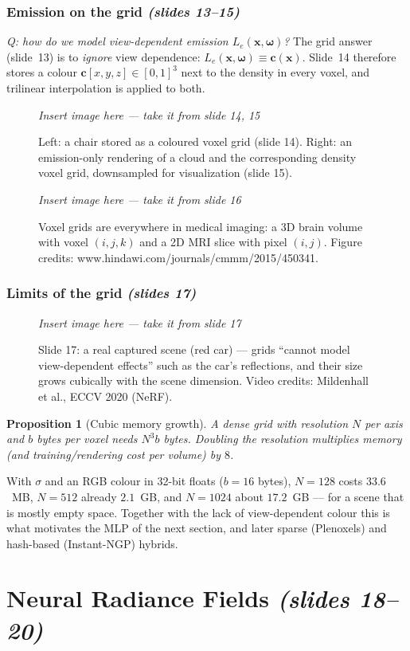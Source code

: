 \documentclass[11pt,a4paper]{article}
\newcommand{\xx}{\boldsymbol{x}}
\newcommand{\om}{\boldsymbol{\omega}}
\newcommand{\cc}{\boldsymbol{c}}
\newcommand{\Le}{L_e}
\newcommand{\sref}[1]{\texorpdfstring{\emph{(slides #1)}}{(slides #1)}}
\theoremstyle{definition}
\theoremstyle{plain}
\newtheorem{proposition}{Proposition}[section]
\newcommand{\slideimg}[3]{%
\begin{figure}[H]
\centering
\begin{tcolorbox}[enhanced,colback=white,colframe=white,boxrule=0pt,sharp corners,overlay={\draw[dashed,gray,thick] (frame.south west) rectangle (frame.north east);},
  width=0.92\linewidth,height=#2,valign=center,halign=center]
{\color{gray}\itshape Insert image here --- take it from slide #1}
\end{tcolorbox}
\caption{#3}
\end{figure}}
\begin{document}
\subsubsection*{Emission on the grid \sref{13--15}}

\emph{Q: how do we model view-dependent emission $\Le(\xx,\om)$?} The grid answer (slide~13) is to \emph{ignore} view dependence: $\Le(\xx,\om)\equiv\cc(\xx)$. Slide~14 therefore stores a colour $\cc[x,y,z]\in[0,1]^3$ next to the density in every voxel, and trilinear interpolation is applied to both.

\slideimg{14, 15}{4.4cm}{Left: a chair stored as a coloured voxel grid (slide 14). Right: an emission-only rendering of a cloud and the corresponding density voxel grid, downsampled for visualization (slide 15).}

\slideimg{16}{4.2cm}{Voxel grids are everywhere in medical imaging: a 3D brain volume with voxel $(i,j,k)$ and a 2D MRI slice with pixel $(i,j)$. Figure credits: www.hindawi.com/journals/cmmm/2015/450341.}

\subsubsection*{Limits of the grid \sref{17}}

\slideimg{17}{4.2cm}{Slide 17: a real captured scene (red car) --- grids ``cannot model view-dependent effects'' such as the car's reflections, and their size grows cubically with the scene dimension. Video credits: Mildenhall et al., ECCV 2020 (NeRF).}

\begin{proposition}[Cubic memory growth]\label{prop:cubic}
A dense grid with resolution $N$ per axis and $b$ bytes per voxel needs $N^3b$ bytes. Doubling the resolution multiplies memory (and training/rendering cost per volume) by $8$.
\end{proposition}
\begin{intuition}
With $\sigma$ and an RGB colour in 32-bit floats ($b=16$ bytes), $N=128$ costs $33.6$~MB, $N=512$ already $2.1$~GB, and $N=1024$ about $17.2$~GB --- for a scene that is mostly empty space. Together with the lack of view-dependent colour this is what motivates the MLP of the next section, and later sparse (Plenoxels) and hash-based (Instant-NGP) hybrids.
\end{intuition}

\section{Neural Radiance Fields \sref{18--20}}
\end{document}
